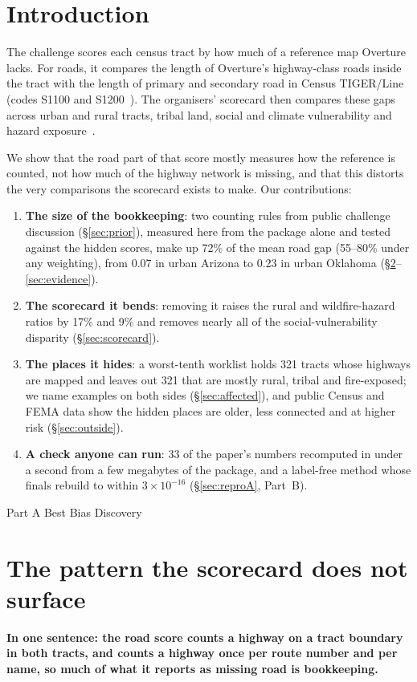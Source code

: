 \documentclass[10pt,twocolumn,a4paper]{article}
\newcommand{\partbanner}[2]{%
  \par\Needspace{14\baselineskip}\vspace{6pt}\noindent
  \colorbox{#1}{\parbox{\dimexpr\columnwidth-2\fboxsep}{\color{white}\bfseries\strut #2}}\par\nopagebreak\vspace{2pt}}
\begin{document}
\section{Introduction}
\label{sec:intro}
The challenge scores each census tract by how much of a reference map Overture lacks. For roads, it compares the length of
Overture's highway-class roads inside the tract with the length of primary and secondary road in Census TIGER/Line (codes
S1100 and S1200~\cite{mtfcc}). The organisers' scorecard then compares these gaps across urban and rural tracts, tribal
land, social and climate vulnerability and hazard exposure~\cite{zindi}.

We show that the road part of that score mostly measures how the reference is counted, not how much of the highway network
is missing, and that this distorts the very comparisons the scorecard exists to make. Our contributions:
\begin{enumerate}
\item \textbf{The size of the bookkeeping}: two counting rules from public challenge discussion (\S\ref{sec:prior}),
measured here from the package alone and tested against the hidden scores, make up 72\% of the mean road gap (55--80\%
under any weighting), from 0.07 in urban Arizona to 0.23 in urban Oklahoma (\S\ref{sec:pattern}--\ref{sec:evidence}).
\item \textbf{The scorecard it bends}: removing it raises the rural and wildfire-hazard ratios by 17\% and 9\% and
removes nearly all of the social-vulnerability disparity (\S\ref{sec:scorecard}).
\item \textbf{The places it hides}: a worst-tenth worklist holds 321 tracts whose highways are mapped and leaves out 321
that are mostly rural, tribal and fire-exposed; we name examples on both sides (\S\ref{sec:affected}), and public Census
and FEMA data show the hidden places are older, less connected and at higher risk (\S\ref{sec:outside}).
\item \textbf{A check anyone can run}: 33 of the paper's numbers recomputed in under a second from a few megabytes of the
package, and a label-free method whose finals rebuild to within $3\times10^{-16}$ (\S\ref{sec:reproA}, Part~B).
\end{enumerate}

\partbanner{accent}{Part A \quad Best Bias Discovery}

\section{The pattern the scorecard does not surface}
\label{sec:pattern}
\textbf{In one sentence: the road score counts a highway on a tract boundary in both tracts, and counts a highway once
per route number and per name, so much of what it reports as missing road is bookkeeping.}
\end{document}
